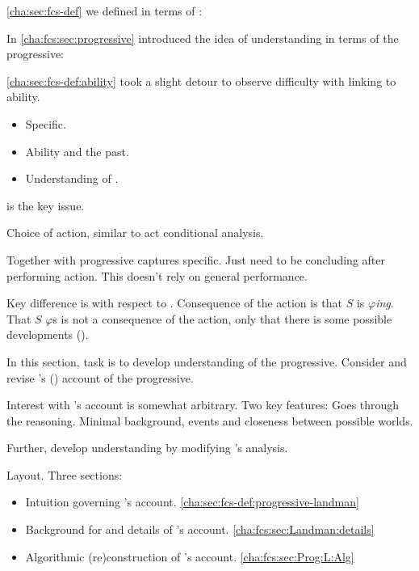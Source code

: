 \begin{note}
  \autoref{cha:sec:fcs-def} we defined  in terms of :

  \vspace{-\baselineskip}
  \begin{quote}
  \end{quote}

  In \autoref{cha:fcs:sec:progressive} introduced the idea of understanding  in terms of the progressive:

  \vspace{-\baselineskip}
  \begin{quote}
  \end{quote}

  \autoref{cha:sec:fcs-def:ability} took a slight detour to observe difficulty with linking  to ability.
  \begin{itemize}
  \item
    Specific.
  \item
    Ability and the past.
  \item
    Understanding of \AbControl{}.
  \end{itemize}
  \AbControl{} is the key issue.

  Choice of action, similar to act conditional analysis.

  Together with progressive captures specific.
  Just need to be concluding after performing action.
  This doesn't rely on general performance.

  Key difference is with respect to \AbControl{}.
  Consequence of the action is that \(S\) is \(\varphi\)\emph{ing}.
  That \(S\) \(\varphi\)s is not a consequence of the action, only that there is some possible developments ().

  In this section, task is to develop understanding of the progressive.
  Consider and revise \citeauthor{Landman:1992wh}'s (\citeyear{Landman:1992wh}) account of the progressive.

  Interest with \citeauthor{Landman:1992wh}'s account is somewhat arbitrary.
  Two key features:
  Goes through the reasoning.
  Minimal background, events and closeness between possible worlds.

  Further, develop understanding by modifying \citeauthor{Landman:1992wh}'s analysis.
\end{note}

\begin{note}
  Layout.
  Three sections:
  \begin{itemize}[noitemsep]
  \item
    Intuition governing \citeauthor{Landman:1992wh}'s account.%
    \hfill\autoref{cha:sec:fcs-def:progressive-landman}
  \item
    Background for and details of \citeauthor{Landman:1992wh}'s account.%
    \hfill \autoref{cha:fcs:sec:Landman:details}
  \item
    Algorithmic (re)construction of \citeauthor{Landman:1992wh}'s account.%
    \hfill \autoref{cha:fcs:sec:Prog:L:Alg}
  \end{itemize}
\end{note}



